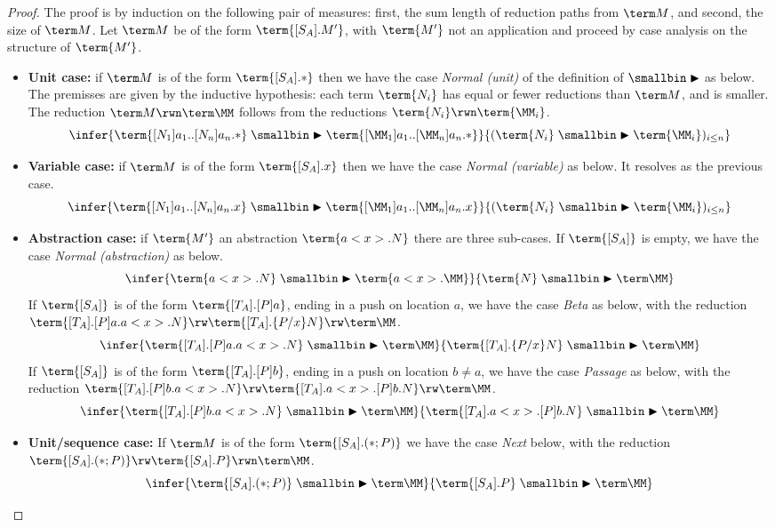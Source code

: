 \documentclass[a4paper,UKenglish,cleveref, autoref, thm-restate]{lipics-v2021}
\newcommand\case[1]{\textbf{#1}}
\newcommand\rp{\mathrel{\smallbin\blacktriangleright}}
\begin{document}
\begin{proof}
The proof is by induction on the following pair of measures: first, the sum length of reduction paths from $\term M$, and second, the size of $\term M$. Let $\term M$ be of the form $\term{[S_A].M'}$, with $\term{M'}$ not an application and proceed by case analysis on the structure of $\term{M'}$.
\begin{itemize}
	
	\item\case{Unit case:} if $\term M$ is of the form $\term{[S_A].*}$ then we have the case \emph{Normal (unit)} of the definition of $\rp$ as below. The premisses are given by the inductive hypothesis: each term $\term{N_i}$ has equal or fewer reductions than $\term M$, and is smaller. The reduction $\term M\rwn\term\MM$ follows from the reductions $\term{N_i}\rwn\term{\MM_i}$.
\[
\infer{\term{[N_1]a_1..[N_n]a_n.*} \rp \term{[\MM_1]a_1..[\MM_n]a_n.*}}{(\term{N_i}\rp\term{\MM_i})_{i\leq n}}
\]

	\item\case{Variable case:} if $\term M$ is of the form $\term{[S_A].x}$ then we have the case \emph{Normal (variable)} as below. It resolves as the previous case.
\[
\infer{\term{[N_1]a_1..[N_n]a_n.x} \rp \term{[\MM_1]a_1..[\MM_n]a_n.x}}{(\term{N_i}\rp\term{\MM_i})_{i\leq n}}
\]

	\item\case{Abstraction case:} if $\term{M'}$ an abstraction $\term{a<x>.N}$ there are three sub-cases. If $\term{[S_A]}$ is empty, we have the case \emph{Normal (abstraction)} as below.
\[
\infer{\term{a<x>.N}\rp\term{a<x>.\MM}}{\term{N}\rp\term \MM}
\]
If $\term{[S_A]}$ is of the form $\term{[T_A].[P]a}$, ending in a push on location $a$, we have the case \emph{Beta} as below, with the reduction $\term{[T_A].[P]a.a<x>.N}\rw\term{[T_A].\{P/x\}N}\rw\term\MM$.
\[
\infer{\term{[T_A].[P]a.a<x>.N}\rp\term\MM}{\term{[T_A].\{P/x\}N}\rp\term\MM}
\]
If $\term{[S_A]}$ is of the form $\term{[T_A].[P]b}$, ending in a push on location $b\neq a$, we have the case \emph{Passage} as below, with the reduction $\term{[T_A].[P]b.a<x>.N}\rw\term{[T_A].a<x>.[P]b.N}\rw\term\MM$.
\[
\infer{\term{[T_A].[P]b.a<x>.N}\rp\term\MM}{\term{[T_A].a<x>.[P]b.N}\rp\term\MM}
\]
	\item\case{Unit/sequence case:}
If $\term M$ is of the form $\term{[S_A].(*;P)}$ we have the case \emph{Next} below, with the reduction $\term{[S_A].(*;P)}\rw\term{[S_A].P}\rwn\term\MM$. 
\[
\infer{\term{[S_A].(*;P)} \rp \term\MM}{\term{[S_A].P}\rp \term\MM}
\]


\end{itemize}
\end{proof}
\end{document}
